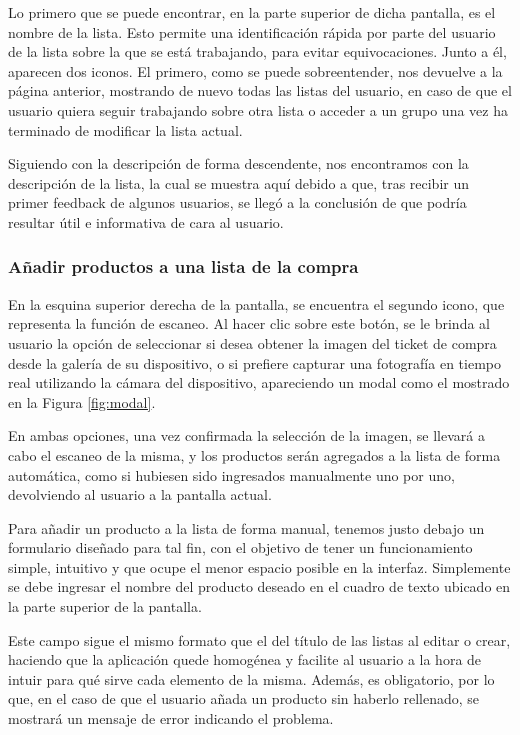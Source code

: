 \documentclass{article}
\begin{document}
Lo primero que se puede encontrar, en la parte superior de dicha pantalla, es el nombre de la lista. Esto permite una identificación rápida por parte del usuario de la lista sobre la que se está trabajando, para evitar equivocaciones. Junto a él, aparecen dos iconos. El primero, como se puede sobreentender, nos devuelve a la página anterior, mostrando de nuevo todas las listas del usuario, en caso de que el usuario quiera seguir trabajando sobre otra lista o acceder a un grupo una vez ha terminado de modificar la lista actual.

Siguiendo con la descripción de forma descendente, nos encontramos con la descripción de la lista, la cual se muestra aquí debido a que, tras recibir un primer feedback de algunos usuarios, se llegó a la conclusión de que podría resultar útil e informativa de cara al usuario.

\subsubsection{Añadir productos a una lista de la compra}

En la esquina superior derecha de la pantalla, se encuentra el segundo icono, que representa la función de escaneo. Al hacer clic sobre este botón, se le brinda al usuario la opción de seleccionar si desea obtener la imagen del ticket de compra desde la galería de su dispositivo, o si prefiere capturar una fotografía en tiempo real utilizando la cámara del dispositivo, apareciendo un modal como el mostrado en la Figura \ref{fig:modal}.

En ambas opciones, una vez confirmada la selección de la imagen, se llevará a cabo el escaneo de la misma, y los productos serán agregados a la lista de forma automática, como si hubiesen sido ingresados manualmente uno por uno, devolviendo al usuario a la pantalla actual.

Para añadir un producto a la lista de forma manual, tenemos justo debajo un formulario diseñado para tal fin, con el objetivo de tener un funcionamiento simple, intuitivo y que ocupe el menor espacio posible en la interfaz. Simplemente se debe ingresar el nombre del producto deseado en el cuadro de texto ubicado en la parte superior de la pantalla.

Este campo sigue el mismo formato que el del título de las listas al editar o crear, haciendo que la aplicación quede homogénea y facilite al usuario a la hora de intuir para qué sirve cada elemento de la misma. Además, es obligatorio, por lo que, en el caso de que el usuario añada un producto sin haberlo rellenado, se mostrará un mensaje de error indicando el problema.
\end{document}
